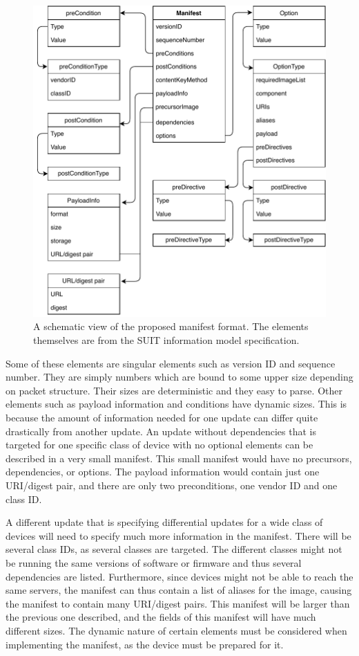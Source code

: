 \documentclass[0-thesis.tex]{subfiles}
\begin{document}
\begin{figure}
    \caption[A schematic view of the proposed manifest format.]
        {A schematic view of the proposed manifest format. The elements themselves are from the SUIT information model specification.}
    \label{fig:manifest-format}
    \includegraphics{images/manifest-format.pdf}
\end{figure}

Some of these elements are singular elements such as version ID and sequence number. They
are simply numbers which are bound to some upper size depending on packet structure. Their
sizes are deterministic and they easy to parse. Other elements such as payload information
and conditions have dynamic sizes. This is because the amount of information needed for
one update can differ quite drastically from another update. An update without
dependencies that is targeted for one specific class of device with no optional elements
can be described in a very small manifest. This small manifest would have no precursors,
dependencies, or options. The payload information would contain just one URI/digest pair,
and there are only two preconditions, one vendor ID and one class ID.

A different update that is specifying differential updates for a wide class of devices
will need to specify much more information in the manifest. There will be several class
IDs, as several classes are targeted. The different classes might not be running the same
versions of software or firmware and thus several dependencies are listed. Furthermore,
since devices might not be able to reach the same servers, the manifest can thus contain a
list of aliases for the image, causing the manifest to contain many URI/digest pairs. This
manifest will be larger than the previous one described, and the fields of this manifest
will have much different sizes. The dynamic nature of certain elements must be considered
when implementing the manifest, as the device must be prepared for it. 
\end{document}
